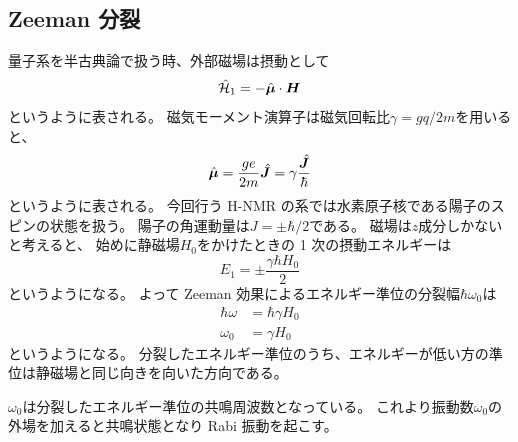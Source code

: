 \documentclass[11pt,dvipdfmx,a4paper]{jsarticle}
\begin{document}
\subsection{Zeeman 分裂}
量子系を半古典論で扱う時、外部磁場は摂動として
\begin{equation}
	\hat{\mathcal{H}}_1 = -\hat{\vb*{\mu}}\cdot \vb*{H}
\end{equation}
というように表される。
磁気モーメント演算子は磁気回転比\(\gamma = gq/2m\)を用いると、
\begin{equation}
	\hat{\vb*{\mu}} = \frac{ge}{2m}\hat{\vb*{J}} = \gamma\frac{\hat{\vb*{J}}}{\hbar}
\end{equation}
というように表される。
今回行う H-NMR の系では水素原子核である陽子のスピンの状態を扱う。
陽子の角運動量は\(J=\pm\hbar/2\)である。
磁場は\(z\)成分しかないと考えると、
始めに静磁場\(H_0\)をかけたときの 1 次の摂動エネルギーは
\begin{equation}
	E_1 = \pm\frac{\gamma\hbar H_0}{2}
\end{equation}
というようになる。
よって Zeeman 効果によるエネルギー準位の分裂幅\(\hbar\omega_0\)は
\begin{align}
	\hbar\omega &= \hbar \gamma H_0\\
	\omega_0 &= \gamma H_0
\end{align}
というようになる。
分裂したエネルギー準位のうち、エネルギーが低い方の準位は静磁場と同じ向きを向いた方向である。

\(\omega_0\)は分裂したエネルギー準位の共鳴周波数となっている。
これより振動数\(\omega_0\)の外場を加えると共鳴状態となり Rabi 振動を起こす。
\end{document}
